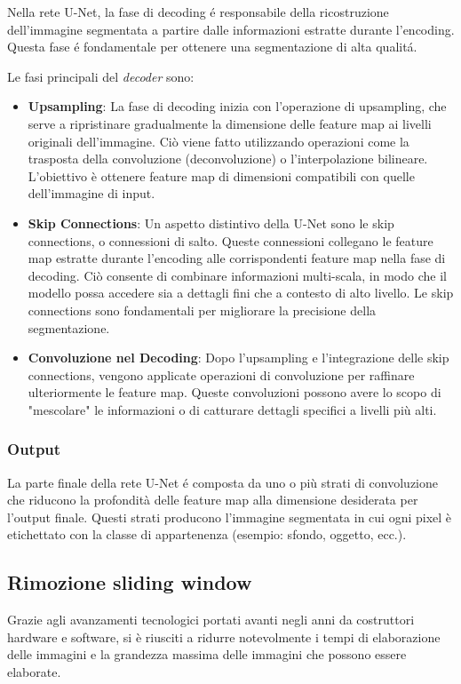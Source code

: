 Nella rete U-Net, la fase di decoding \'e responsabile della ricostruzione dell'immagine segmentata a partire dalle informazioni estratte durante l'encoding. Questa fase \'e fondamentale per ottenere una segmentazione di alta qualit\'a.

Le fasi principali del \textit{decoder} sono:
\begin{itemize}
  \item \textbf{Upsampling}: La fase di decoding inizia con l'operazione di upsampling, che serve a ripristinare gradualmente la dimensione delle feature map ai livelli originali dell'immagine. Ciò viene fatto utilizzando operazioni come la trasposta della convoluzione (deconvoluzione) o l'interpolazione bilineare. L'obiettivo è ottenere feature map di dimensioni compatibili con quelle dell'immagine di input.
  \item \textbf{Skip Connections}: Un aspetto distintivo della U-Net sono le skip connections, o connessioni di salto. Queste connessioni collegano le feature map estratte durante l'encoding alle corrispondenti feature map nella fase di decoding. Ciò consente di combinare informazioni multi-scala, in modo che il modello possa accedere sia a dettagli fini che a contesto di alto livello. Le skip connections sono fondamentali per migliorare la precisione della segmentazione.
  \item \textbf{Convoluzione nel Decoding}: Dopo l'upsampling e l'integrazione delle skip connections, vengono applicate operazioni di convoluzione per raffinare ulteriormente le feature map. Queste convoluzioni possono avere lo scopo di "mescolare" le informazioni o di catturare dettagli specifici a livelli più alti.
\end{itemize}


\subsubsection{Output} %
\label{sec:Output}
La parte finale della rete U-Net \'e composta da uno o più strati di convoluzione che riducono la profondità delle feature map alla dimensione desiderata per l'output finale. Questi strati producono l'immagine segmentata in cui ogni pixel è etichettato con la classe di appartenenza (esempio: sfondo, oggetto, ecc.).


\subsection{Rimozione sliding window} %
\label{sub:Rimozione sliding window}
Grazie agli avanzamenti tecnologici portati avanti negli anni da costruttori hardware e software, si è riusciti a ridurre notevolmente i tempi di elaborazione delle immagini e la grandezza massima delle immagini che possono essere elaborate.

